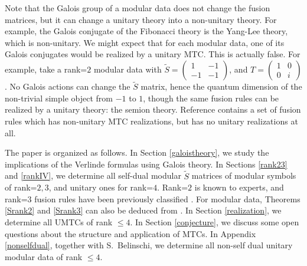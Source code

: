 \documentclass[12pt,psamsfonts]{amsart}
\newcommand{\tS}{\tilde{S}}
\numberwithin{equation}{section}
\theoremstyle{definition}
\begin{document}
Note that the Galois group of a modular data does not change the
fusion matrices, but it can change a unitary theory into a
non-unitary theory.  For example, the Galois conjugate of the
Fibonacci theory is the Yang-Lee theory, which is non-unitary. We
might expect that for each modular data, one of its Galois
conjugates would be realized by a unitary MTC. This is actually
false. For example, take a rank=$2$ modular data with
$\tS=\begin{pmatrix}
   1& -1\\
   -1 & -1
 \end{pmatrix}
 $, and $T=\begin{pmatrix}
   1& 0\\
   0& i
 \end{pmatrix}
 $.  No Galois actions can change the $\tS$ matrix, hence the
 quantum dimension of the non-trivial simple object from $-1$ to $1$, though the
 same fusion rules can be realized by a unitary theory: the semion theory.
 Reference \cite{rowell06} contains a set of fusion rules which has
non-unitary MTC realizations, but has no unitary realizations at
all.

The paper is organized as follows.  In Section \ref{galoistheory},
we study the implications of the Verlinde formulas using Galois
theory.  In Sections \ref{rank23} and \ref{rankIV}, we determine
all self-dual modular $\tS$ matrices of modular symbols of
rank=$2,3$, and unitary ones for rank=$4$.  Rank=$2$ is known to experts, and
rank=$3$ fusion rules have been previously classified \cite{CP}.  For modular data,
Theorems \ref{Srank2} and \ref{Srank3} can also be deduced from
\cite{Ostrik1}\cite{Ostrik2}.
 In Section \ref{realization}, we determine all UMTCs of rank $\leq 4$.
 In Section \ref{conjecture}, we discuss some open
questions about the structure and application of MTCs.  In
Appendix \ref{nonselfdual}, together with S.~Belinschi, we
determine all non-self dual unitary modular data of rank $\leq 4$.
\end{document}
